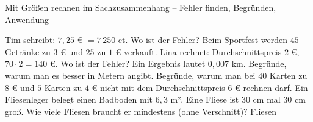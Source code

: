 \begin{aufgabe}{Mit Größen rechnen im Sachzusammenhang – Fehler finden, Begründen, Anwendung}
\begin{teile}
\teil Tim schreibt: $7{,}25$ € $= 7\,250$ ct. Wo ist der Fehler?
\teil Beim Sportfest werden $45$ Getränke zu $3$ € und $25$ zu $1$ € verkauft. Lina rechnet: Durchschnittspreis $2$ €, $70 \cdot 2 = 140$ €. Wo ist der Fehler?
\teil Ein Ergebnis lautet $0{,}007$ km. Begründe, warum man es besser in Metern angibt.
\teil Begründe, warum man bei $40$ Karten zu $8$ € und $5$ Karten zu $4$ € nicht mit dem Durchschnittspreis $6$ € rechnen darf.
\teil Ein Fliesenleger belegt einen Badboden mit $6{,}3$ m². Eine Fliese ist $30$ cm mal $30$ cm groß. Wie viele Fliesen braucht er mindestens (ohne Verschnitt)? \leerfeld Fliesen
\end{teile}
\end{aufgabe}
